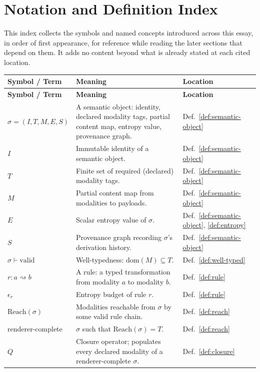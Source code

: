 \documentclass[11pt]{article}
\theoremstyle{definition}
\begin{document}
\section{Notation and Definition Index}

This index collects the symbols and named concepts introduced across this essay, in order of first appearance, for reference while reading the later sections that depend on them. It adds no content beyond what is already stated at each cited location.

\renewcommand{\arraystretch}{1.25}
\begin{longtable}{@{}p{}p{}p{}@{}}
\toprule
\textbf{Symbol / Term} & \textbf{Meaning} & \textbf{Location} \\
\midrule
\endfirsthead
\toprule
\textbf{Symbol / Term} & \textbf{Meaning} & \textbf{Location} \\
\midrule
\endhead
$\sigma = (I,T,M,E,S)$ & A semantic object: identity, declared modality tags, partial content map, entropy value, provenance graph. & Def.~\ref{def:semantic-object} \\
$I$ & Immutable identity of a semantic object. & Def.~\ref{def:semantic-object} \\
$T$ & Finite set of required (declared) modality tags. & Def.~\ref{def:semantic-object} \\
$M$ & Partial content map from modalities to payloads. & Def.~\ref{def:semantic-object} \\
$E$ & Scalar entropy value of $\sigma$. & Def.~\ref{def:semantic-object}, \ref{def:entropy} \\
$S$ & Provenance graph recording $\sigma$'s derivation history. & Def.~\ref{def:semantic-object} \\
$\sigma \vdash \mathrm{valid}$ & Well-typedness: $\mathrm{dom}(M) \subseteq T$. & Def.~\ref{def:well-typed} \\
$r : a \rightsquigarrow b$ & A rule: a typed transformation from modality $a$ to modality $b$. & Def.~\ref{def:rule} \\
$\epsilon_r$ & Entropy budget of rule $r$. & Def.~\ref{def:rule} \\
$\mathrm{Reach}(\sigma)$ & Modalities reachable from $\sigma$ by some valid rule chain. & Def.~\ref{def:reach} \\
renderer-complete & $\sigma$ such that $\mathrm{Reach}(\sigma) = T$. & Def.~\ref{def:reach} \\
$Q$ & Closure operator; populates every declared modality of a renderer-complete $\sigma$. & Def.~\ref{def:closure} \\

\end{longtable}
\end{document}
